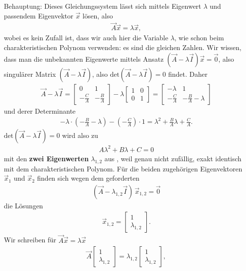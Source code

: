 Behauptung:
Dieses Gleichungssystem lässt sich mittels Eigenwert $\lambda$ und passendem
Eigenvektor $\vec{x}$ lösen, also
\begin{align}
\vec{A} \vec{x} = \lambda \vec{x},
\end{align}
wobei es kein Zufall ist, dass wir auch hier die Variable $\lambda$, wie schon
beim charakteristischen Polynom verwenden: es sind die gleichen Zahlen.
Wir wissen, dass man die unbekannten Eigenwerte mittels Ansatz
$(\vec{A} - \lambda \vec{I})\vec{x} = \vec{0}$, also singulärer Matrix
$(\vec{A} - \lambda \vec{I})$, also $\mathrm{det}(\vec{A} - \lambda \vec{I})=0$
findet.
%
Daher
\begin{align}
\vec{A} - \lambda \vec{I} =
\begin{bmatrix}
0 & 1 \\ -\frac{C}{A} & -\frac{B}{A}
\end{bmatrix}
-\lambda
\begin{bmatrix}
1 & 0 \\ 0 & 1
\end{bmatrix}
=
\begin{bmatrix}
-\lambda & 1 \\ -\frac{C}{A} & -\frac{B}{A} - \lambda
\end{bmatrix}
\end{align}
und derer Determinante
\begin{align}
-\lambda \cdot (-\frac{B}{A} - \lambda) - (-\frac{C}{A})\cdot 1 = \lambda^2 + \frac{B}{A} \lambda + \frac{C}{A}.
\end{align}
%
$\mathrm{det}(\vec{A} - \lambda \vec{I})=0$ wird also zu
\begin{align}
A \lambda^2 + B \lambda + C = 0
\end{align}
mit den \textbf{zwei Eigenwerten} $\lambda_{1,2}$ aus ,
weil genau nicht zufällig, exakt identisch mit dem charakteristischen Polynom.
%
Für die beiden zugehörigen Eigenvektoren $\vec{x}_{1}$ und $\vec{x}_{2}$ finden sich wegen
dem geforderten
\begin{align}
(\vec{A} - \lambda_{1,2} \vec{I}) \, \vec{x}_{1,2} = \vec{0}
\end{align}
die Lösungen
\begin{align}
\vec{x}_{1,2} =
\begin{bmatrix}
1 \\ \lambda_{1,2}
\end{bmatrix}.
\end{align}
%
Wir schreiben für $\vec{A} \vec{x} = \lambda \vec{x}$
%
\begin{align}
\vec{A}
\begin{bmatrix}
1 \\ \lambda_{1,2}
\end{bmatrix} = \lambda_{1,2}
\begin{bmatrix}
1 \\ \lambda_{1,2}
\end{bmatrix},
\end{align}
